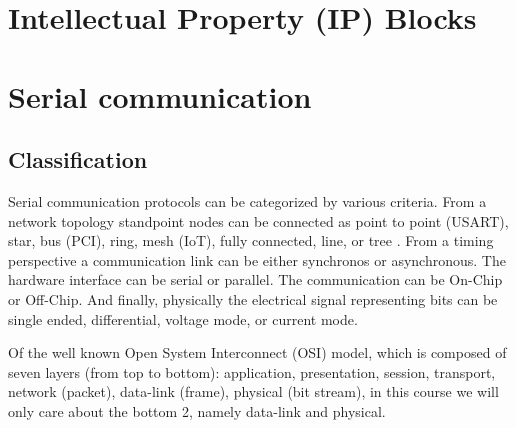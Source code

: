 \documentclass[margin=small]{tex/hsrzf}
\begin{document}
\section{Intellectual Property (IP) Blocks}

\section{Serial communication}

\subsection{Classification}

Serial communication protocols can be categorized by various criteria. From a network topology standpoint nodes can be connected as point to point (USART), star, bus (PCI), ring, mesh (IoT), fully connected, line, or tree . From a timing perspective a communication link can be either synchronos or asynchronous. The hardware interface can be serial or parallel. The communication can be On-Chip or Off-Chip. And finally, physically the electrical signal representing bits can be single ended, differential, voltage mode, or current mode.

Of the well known Open System Interconnect (OSI) model, which is composed of seven layers (from top to bottom): application, presentation, session, transport, network (packet), data-link (frame), physical (bit stream), in this course we will only care about the bottom 2, namely data-link and physical.
\end{document}
